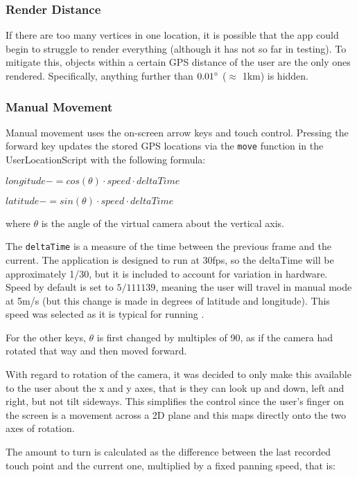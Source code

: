 \documentclass[12pt, a4paper]{article}
\begin{document}
\subsubsection{Render Distance}
If there are too many vertices in one location, it is possible that the app could begin to struggle to render everything (although it has not so far in testing). To mitigate this, objects within a certain GPS distance of the user are the only ones rendered. Specifically, anything further than $0.01\degree$ ($\approx$ 1km) is hidden.

\subsubsection{Manual Movement}
\label{manualmovement}
Manual movement uses the on-screen arrow keys and touch control. Pressing the forward key updates the stored GPS locations via the \verb|move| function in the UserLocationScript with the following formula:

\hspace{1cm} $longitude -= cos(\theta) \cdot speed \cdot deltaTime$

\hspace{1cm} $latitude -= sin(\theta) \cdot speed \cdot deltaTime$

where $\theta$ is the angle of the virtual camera about the vertical axis.

The \verb|deltaTime| is a measure of the time between the previous frame and the current. The application is designed to run at 30fps, so the deltaTime will be approximately 1/30, but it is included to account for variation in hardware. Speed by default is set to $5/111139$, meaning the user will travel in manual mode at 5m/s (but this change is made in degrees of latitude and longitude). This speed was selected as it is typical for running \cite{movement:runningspeed}.

For the other keys, $\theta$ is first changed by multiples of 90\degree, as if the camera had rotated that way and then moved forward.

With regard to rotation of the camera, it was decided to only make this available to the user about the x and y axes, that is they can look up and down, left and right, but not tilt sideways. This simplifies the control since the user's finger on the screen is a movement across a 2D plane and this maps directly onto the two axes of rotation. 

The amount to turn is calculated as the difference between the last recorded touch point and the current one, multiplied by a fixed panning speed, that is:
\end{document}
